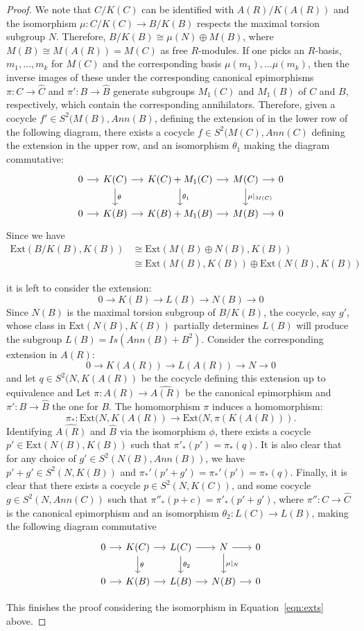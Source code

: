 \documentclass[10pt,a4paper]{amsart}
\def\Ext{\text{Ext}}
\begin{document}
\begin{proof}
We note that $C/K(C)$ can be identified with $A(R)/K(A(R))$ and the isomorphism $\mu:C/K(C) \to B/K(B)$ respects the maximal torsion subgroup $N$. Therefore, $B/K(B)\cong \mu(N) \oplus M(B)$, where $M(B)\cong M(A(R))=M(C)$ as free $R$-modules. If one picks an $R$-basis, $m_1, \ldots ,m_k$ for $M(C)$ and the corresponding basis $\mu(m_1), \ldots \mu(m_k)$, then the inverse images of these under the corresponding canonical epimorphisms $\pi:C\to\widehat{C}$ and $\pi':B\to \widehat{B}$ generate subgroups $M_1(C)$ and $M_1(B)$ of $C$ and $B$, respectively, which contain the corresponding annihilators. Therefore, given a cocycle $f'\in S^2(M(B), Ann(B)$, defining the extension of in the lower row of the following diagram, there exists a cocycle $f\in S^2(M(C), Ann(C)$ defining the extension in the upper row, and an isomorphism $\theta_1$ making the diagram commutative:
$$\begin{tikzcd}[column sep=small]
0 \arrow[r] & K(C) \arrow[r]  \arrow[d,"\theta"] &
K(C)+M_1(C) \arrow[r] \arrow[d, "\theta_1"]&
M(C) \arrow[r]\arrow[d,"\mu|_{M(C)}"] &0\\
0 \arrow[r] & K(B) \arrow[r] &
K(B)+M_1(B) \arrow[r]  &
M(B) \arrow[r]  & 0
\end{tikzcd}$$
Since we have 
\begin{equation}\label{eqn:exts}
\begin{split}
\Ext(B/K(B),K(B))&\cong \Ext(M(B)\oplus N(B), K(B))\\
&\cong  \Ext(M(B), K(B))\oplus  \Ext(N(B), K(B))
\end{split}
\end{equation}

it is left to consider the extension:
$$0\to K(B)\to L(B) \to N(B)\to 0$$
Since $N(B)$ is the maximal torsion subgroup of $B/K(B)$, the cocycle, say $g'$, whose class in $\Ext (N(B), K(B))$ partially determines $L(B)$ will produce the subgroup $L(B)=Is(Ann(B) + B^2)$. Consider the corresponding extension in $A(R)$:
$$0\to K(A(R))\to L(A(R)) \to N\to 0$$
and let $q\in S^2(N, K(A(R))$ be the cocycle defining this extension up to equivalence and
Let $\pi:A(R) \to \widehat{A(R)}$ be the canonical epimorphism and $\pi': B \to \widehat{B}$ the one for $B$. The homomorphism $\pi$ induces a homomorphism: $$\pi_*: \Ext(N, K(A(R)) \to \Ext(N, \pi(K(A(R))).$$ Identifying $\widehat{A(R)}$ and $\widehat{B}$ via the isomorphism $\phi$, there exists a cocycle $p'\in \Ext(N(B), K(B))$ such that $\pi'_*(p')=\pi_*(q)$. It is also clear that for any choice of $g'\in S^2(N(B), Ann(B))$, we have $p'+g' \in S^2(N, K(B))$ and $\pi_*'(p'+g')=\pi_*'(p')=\pi_*(q)$. Finally, it is clear that there exists a cocycle $p\in S^2(N, K(C))$, and some cocycle $g\in S^2(N, Ann(C))$ such that $\pi''_*(p+c)=\pi'_*(p'+g')$, where $\pi'':C\to \widehat{C}$ is the canonical epimorphism and an isomorphism $\theta_2: L(C) \to L(B)$, making the following diagram commutative
$$\begin{tikzcd}[column sep=small]
0 \arrow[r] & K(C) \arrow[r]  \arrow[d,"\theta"] &
L(C) \arrow[r] \arrow[d, "\theta_2"]&
N \arrow[r]\arrow[d,"\mu|_{N}"] &0\\
0 \arrow[r] & K(B) \arrow[r] &
L(B) \arrow[r]  &
N(B) \arrow[r]  & 0
\end{tikzcd}$$

This finishes the proof considering the isomorphism in Equation~\ref{eqn:exts} above.
\end{proof}
\end{document}
